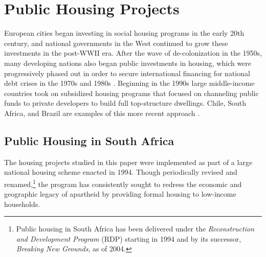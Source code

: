 \documentclass[12pt]{article}
\begin{document}
\section{Public Housing Projects}\label{section:background}


European cities began investing in social housing programs in the early 20th century, and national governments in the West continued to grow these investments in the post-WWII era. After the wave of de-colonization in the 1950s, many developing nations also began public investments in housing, which were progressively phased out in order to secure international financing for national debt crises in the 1970s and 1980s \citep{rondinelli1990housing}. Beginning in the 1990s large middle-income countries took on subsidized housing programs that focused on channeling public funds to private developers to build full top-structure dwellings. Chile, South Africa, and Brazil are examples of this more recent approach \citep{buckley2005housing}.


\subsection{Public Housing in South Africa}


The housing projects studied in this paper were implemented as part of a large national housing scheme enacted in 1994. Though periodically revised and renamed,\footnote{Public housing in South Africa has been delivered under the {\it Reconstruction and Development Program} (RDP) starting in 1994 and  by its successor, {\it Breaking New Grounds}, as of 2004.} the program has consistently sought to redress the economic and geographic legacy of apartheid by providing formal housing to low-income households.  
\end{document}
